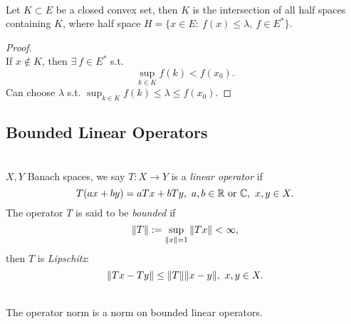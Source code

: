 \begin{corollary}\ \\
Let $K \subset E$ be a closed convex set, then $K$ is the intersection of all half spaces containing $K$, where half space $H = \{x \in E:\ f(x) \leq \lambda,\ f \in E^*\}$.
\end{corollary}
\begin{proof}\ \\
If $x \notin K$, then $\exists\ f \in E^*$ s.t.
\begin{equation*}
    \sup_{k \in K} f(k) < f(x_0).
\end{equation*}
Can choose $\lambda$ s.t. $\sup_{k \in K} f(k) \leq \lambda \leq f(x_0)$.
\end{proof}

\vspace{12pt}
\subsection{Bounded Linear Operators}

\begin{definition}\ \\
    $X,Y$ Banach spaces, we say $T: X \to Y$ is a \textit{linear operator} if 
    \begin{equation*}
        T(ax + by) = a Tx + b Ty,\ a,b \in \mathbb{R} \text{ or }\mathbb{C},\ x,y \in X.
    \end{equation*}
    The operator $T$ is said to be \textit{bounded} if
    \begin{equation*}
        \norm{T} := \sup_{\norm{x} = 1} \norm{Tx} < \infty,
    \end{equation*}
    then $T$ is \textit{Lipschitz}:
    \begin{equation*}
        \norm{Tx - Ty} \leq \norm{T} \norm{x - y},\ x,y \in X.
    \end{equation*}
\end{definition}

\begin{remark}\ \\
The operator norm is a norm on bounded linear operators.
\end{remark}


